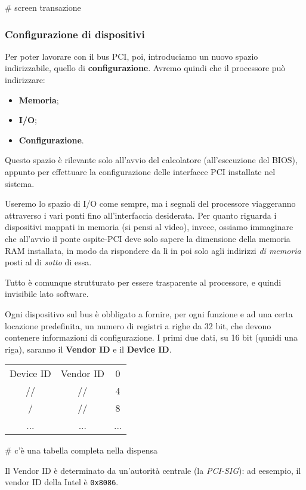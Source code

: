 \documentclass[a4paper,11pt]{article}
\begin{document}
# screen transazione

\subsubsection{Configurazione di dispositivi}
Per poter lavorare con il bus PCI, poi, introduciamo un nuovo spazio indirizzabile, quello di \textbf{configurazione}.
Avremo quindi che il processore può indirizzare:
\begin{itemize}
	\item \textbf{Memoria};
	\item \textbf{I/O};
	\item \textbf{Configurazione}.
\end{itemize}
Questo spazio è rilevante solo all'avvio del calcolatore (all'esecuzione del BIOS), appunto per effettuare la configurazione delle interfacce PCI installate nel sistema.

Useremo lo spazio di I/O come sempre, ma i segnali del processore viaggeranno attraverso i vari ponti fino all'interfaccia desiderata.
Per quanto riguarda i dispositivi mappati in memoria (si pensi al video), invece, ossiamo immaginare che all'avvio il ponte ospite-PCI deve solo sapere la dimensione della memoria RAM installata, in modo da rispondere da lì in poi solo agli indirizzi \textit{di memoria} posti al di \textit{sotto} di essa.

Tutto è comunque strutturato per essere trasparente al processore, e quindi invisibile lato software.

Ogni dispositivo sul bus è obbligato a fornire, per ogni funzione e ad una certa locazione predefinita, un numero di registri a righe da 32 bit, che devono contenere informazioni di configurazione.
I primi due dati, su 16 bit (qunidi una riga), saranno il \textbf{Vendor ID} e il \textbf{Device ID}.

\begin{table}[h!]
	\center 
	\begin{tabular} { c | c c }
		Device ID & Vendor ID & 0 \\
		//& // & 4 \\
		/	& // & 8 \\
		... & ... & ...
	\end{tabular}
\end{table}

# c'è una tabella completa nella dispensa

Il Vendor ID è determinato da un'autorità centrale (la \textit{PCI-SIG}): ad eesempio, il vendor ID della Intel è \lstinline|0x8086|.
\end{document}
